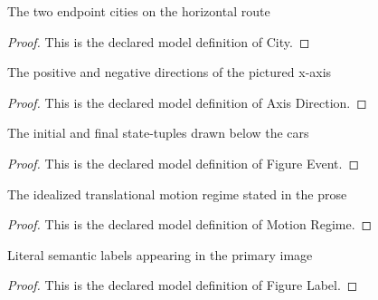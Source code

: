 \begin{definition}[City]
  \label{def:physics:phyx-mini-0830:phyxminiproblems-problemphyxmini0830-city}
  The two endpoint cities on the horizontal route
\end{definition}
\begin{proof}
  This is the declared model definition of City.
\end{proof}
\begin{definition}
  \label{def:physics:phyx-mini-0830:phyxminiproblems-problemphyxmini0830-axisdirection}
  The positive and negative directions of the pictured x-axis
\end{definition}
\begin{proof}
  This is the declared model definition of Axis Direction.
\end{proof}
\begin{definition}
  \label{def:physics:phyx-mini-0830:phyxminiproblems-problemphyxmini0830-figureevent}
  The initial and final state-tuples drawn below the cars
\end{definition}
\begin{proof}
  This is the declared model definition of Figure Event.
\end{proof}
\begin{definition}
  \label{def:physics:phyx-mini-0830:phyxminiproblems-problemphyxmini0830-motionregime}
  The idealized translational motion regime stated in the prose
\end{definition}
\begin{proof}
  This is the declared model definition of Motion Regime.
\end{proof}
\begin{definition}
  \label{def:physics:phyx-mini-0830:phyxminiproblems-problemphyxmini0830-figurelabel}
  Literal semantic labels appearing in the primary image
\end{definition}
\begin{proof}
  This is the declared model definition of Figure Label.
\end{proof}
